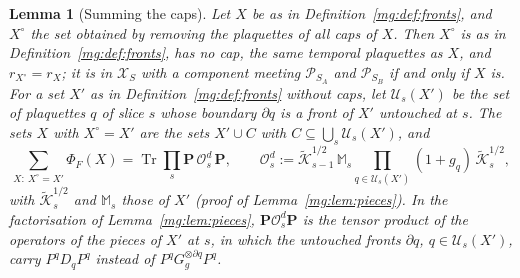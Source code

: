\documentclass[11pt,a4paper]{article}
\newtheorem{lemma}[theorem]{Lemma}
\theoremstyle{definition}
\theoremstyle{remark}
\DeclareMathOperator{\Tr}{Tr}
\newcommand{\cP}{\mathcal{P}}
\newcommand{\cX}{\mathcal{X}}
\begin{document}
\begin{lemma}[Summing the caps]\label{mg:lem:capsum}
Let $X$ be as in Definition~\ref{mg:def:fronts}, and $X^\circ$ the set obtained by removing the plaquettes of all caps of $X$. Then $X^\circ$ is as in
Definition~\ref{mg:def:fronts}, has no cap, the same temporal plaquettes as $X$, and $r_{X^\circ}=r_X$; it is in $\cX_S$ with a component meeting
$\cP_{S_A}$ and $\cP_{S_B}$ if and only if $X$ is. For a set $X'$ as in Definition~\ref{mg:def:fronts} without caps, let $\mathcal U_s(X')$ be the set of
plaquettes $q$ of slice $s$ whose boundary $\partial q$ is a front of $X'$ untouched at $s$. The sets $X$ with $X^\circ=X'$ are the sets $X'\cup C$ with
$C\subseteq\bigcup_s\mathcal U_s(X')$, and
\[
\sum_{X:\ X^\circ=X'}\Phi_F(X)=\Tr\prod_s\mathbf P\,\mathcal O^d_s\,\mathbf P,\qquad\mathcal O^d_s:=\tilde{\mathcal K}^{1/2}_{s-1}\,\mathbb M_s\prod_{q\in\mathcal U_s(X')}(1+g_q)\,
\tilde{\mathcal K}^{1/2}_s ,
\]
with $\tilde{\mathcal K}^{1/2}_s$ and $\mathbb M_s$ those of $X'$ (proof of Lemma~\ref{mg:lem:pieces}). In the factorisation of
Lemma~\ref{mg:lem:pieces}, $\mathbf P\mathcal O^d_s\mathbf P$ is the tensor product of the operators of the pieces of $X'$ at $s$, in which the untouched fronts
$\partial q$, $q\in\mathcal U_s(X')$, carry $P^qD_qP^q$ instead of $P^qG_g^{\otimes\partial q}P^q$.
\end{lemma}
\end{document}
